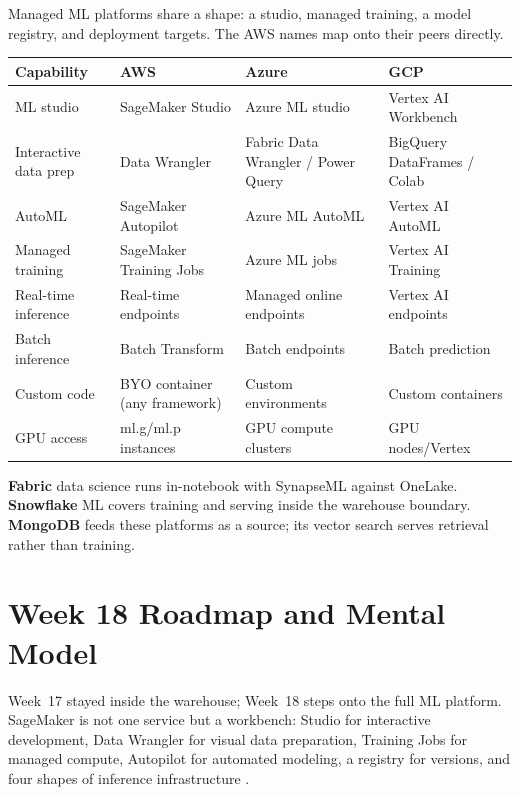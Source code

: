 \begin{crosscloud}
Managed ML platforms share a shape: a studio, managed training, a model registry, and deployment targets. The AWS names map onto their peers directly.

\vspace{2mm}
{\footnotesize
\begin{tabular}{@{}p{2.8cm}p{3.0cm}p{3.0cm}p{3.0cm}@{}}
\toprule
\textbf{Capability} & \textbf{AWS} & \textbf{Azure} & \textbf{GCP} \\
\midrule
ML studio & SageMaker Studio & Azure ML studio & Vertex AI Workbench \\
Interactive data prep & Data Wrangler & Fabric Data Wrangler / Power Query & BigQuery DataFrames / Colab \\
AutoML & SageMaker Autopilot & Azure ML AutoML & Vertex AI AutoML \\
Managed training & SageMaker Training Jobs & Azure ML jobs & Vertex AI Training \\
Real-time inference & Real-time endpoints & Managed online endpoints & Vertex AI endpoints \\
Batch inference & Batch Transform & Batch endpoints & Batch prediction \\
\addlinespace
Custom code & BYO container (any framework) & Custom environments & Custom containers \\
GPU access & ml.g/ml.p instances & GPU compute clusters & GPU nodes/Vertex \\
\bottomrule
\end{tabular}}

\vspace{1mm}
\textbf{Fabric} data science runs in-notebook with SynapseML against OneLake. \textbf{Snowflake} ML covers training and serving inside the warehouse boundary. \textbf{MongoDB} feeds these platforms as a source; its vector search serves retrieval rather than training.
\end{crosscloud}

\section{Week 18 Roadmap and Mental Model}
Week~17 stayed inside the warehouse; Week~18 steps onto the full ML platform. SageMaker is not one service but a workbench: Studio for interactive development, Data Wrangler for visual data preparation, Training Jobs for managed compute, Autopilot for automated modeling, a registry for versions, and four shapes of inference infrastructure \cite{awsSageMakerDocs}.

